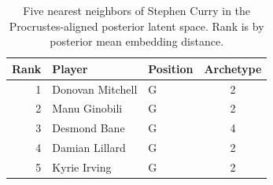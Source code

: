 \begin{table}[htbp]
  \centering\small
  \begin{tabular}{rllc}
    \toprule
    Rank & Player & Position & Archetype \\
    \midrule
    1 & Donovan Mitchell & G & 2 \\
    2 & Manu Ginobili & G & 2 \\
    3 & Desmond Bane & G & 4 \\
    4 & Damian Lillard & G & 2 \\
    5 & Kyrie Irving & G & 2 \\
    \bottomrule
  \end{tabular}
  \caption{Five nearest neighbors of Stephen Curry in the Procrustes-aligned posterior latent space. Rank is by posterior mean embedding distance.}
  \label{tab:Stephen_Curry_neighbors}
\end{table}

